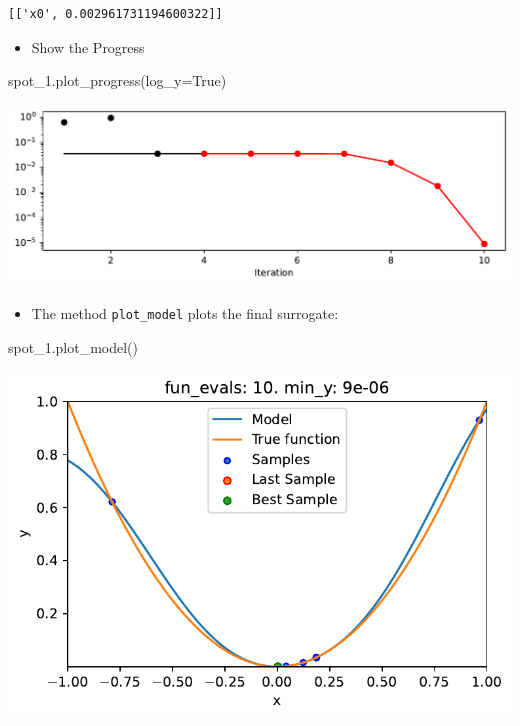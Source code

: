 \documentclass[
  letterpaper,
  DIV=11,
  numbers=noendperiod]{scrreprt}
\newenvironment{Shaded}{\begin{snugshade}}{\end{snugshade}}
\newcommand{\NormalTok}[1]{\textcolor[rgb]{0.00,0.23,0.31}{#1}}
\newcommand{\OperatorTok}[1]{\textcolor[rgb]{0.37,0.37,0.37}{#1}}
\newcommand{\VariableTok}[1]{\textcolor[rgb]{0.07,0.07,0.07}{#1}}
\providecommand{\tightlist}{%
  \setlength{\itemsep}{0pt}\setlength{\parskip}{0pt}}\usepackage{longtable,booktabs,array}
\begin{document}
\begin{verbatim}
[['x0', 0.002961731194600322]]
\end{verbatim}

\begin{itemize}
\tightlist
\item
  Show the Progress
\end{itemize}

\begin{Shaded}
\begin{Highlighting}[]
\NormalTok{spot\_1.plot\_progress(log\_y}\OperatorTok{=}\VariableTok{True}\NormalTok{)}
\end{Highlighting}
\end{Shaded}

\includegraphics{010_num_spot_sklearn_surrogate_files/figure-pdf/cell-41-output-1.pdf}

\begin{itemize}
\tightlist
\item
  The method \texttt{plot\_model} plots the final surrogate:
\end{itemize}

\begin{Shaded}
\begin{Highlighting}[]
\NormalTok{spot\_1.plot\_model()}
\end{Highlighting}
\end{Shaded}

\includegraphics{010_num_spot_sklearn_surrogate_files/figure-pdf/cell-42-output-1.pdf}
\end{document}
